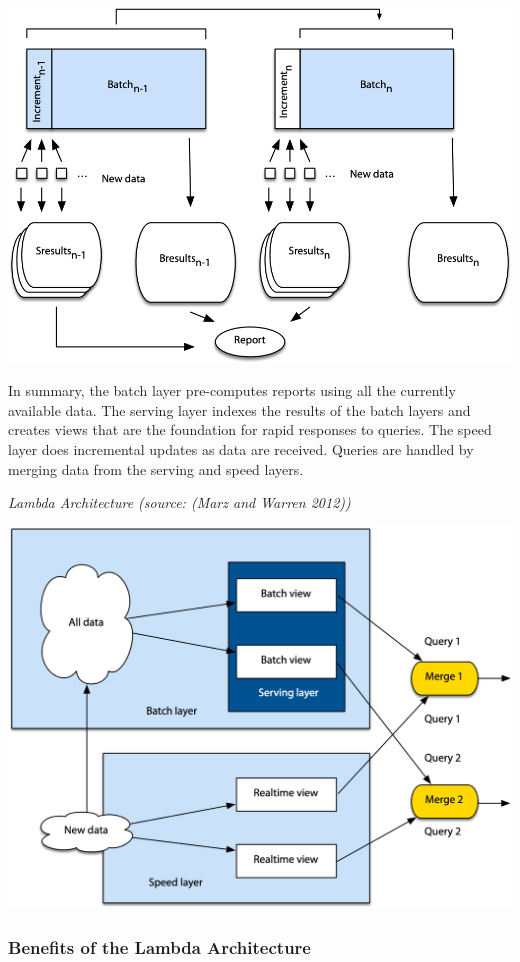 \documentclass[
]{article}
\begin{document}
\includegraphics{Figures/Chapter 18/batch-and-speed.png}

In summary, the batch layer pre-computes reports using all the currently
available data. The serving layer indexes the results of the batch
layers and creates views that are the foundation for rapid responses to
queries. The speed layer does incremental updates as data are received.
Queries are handled by merging data from the serving and speed layers.

\emph{Lambda Architecture (source: (Marz and Warren 2012))}

\includegraphics{Figures/Chapter 18/lambda.png}

\hypertarget{benefits-of-the-lambda-architecture}{%
\subsubsection*{Benefits of the Lambda Architecture}\label{benefits-of-the-lambda-architecture}}
\end{document}
